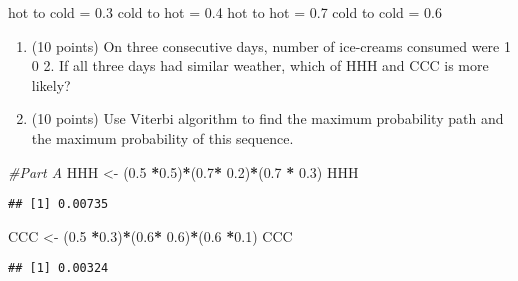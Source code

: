 \documentclass[
]{article}
\newenvironment{Shaded}{\begin{snugshade}}{\end{snugshade}}
\newcommand{\CommentTok}[1]{\textcolor[rgb]{0.56,0.35,0.01}{\textit{#1}}}
\newcommand{\FloatTok}[1]{\textcolor[rgb]{0.00,0.00,0.81}{#1}}
\newcommand{\NormalTok}[1]{#1}
\newcommand{\OperatorTok}[1]{\textcolor[rgb]{0.81,0.36,0.00}{\textbf{#1}}}
\newcommand{\StringTok}[1]{\textcolor[rgb]{0.31,0.60,0.02}{#1}}
\providecommand{\tightlist}{%
  \setlength{\itemsep}{0pt}\setlength{\parskip}{0pt}}
\begin{document}
hot to cold = 0.3 cold to hot = 0.4 hot to hot = 0.7 cold to cold = 0.6

\begin{enumerate}
\def\labelenumi{(\alph{enumi})}
\tightlist
\item
  (10 points) On three consecutive days, number of ice-creams consumed
  were 1 0 2. If all three days had similar weather, which of HHH and
  CCC is more likely?
\item
  (10 points) Use Viterbi algorithm to find the maximum probability path
  and the maximum probability of this sequence.
\end{enumerate}

\begin{Shaded}
\begin{Highlighting}[]
\CommentTok{#Part A}
\NormalTok{HHH <-}\StringTok{ }\NormalTok{(}\FloatTok{0.5} \OperatorTok{*}\FloatTok{0.5}\NormalTok{)}\OperatorTok{*}\NormalTok{(}\FloatTok{0.7}\OperatorTok{*}\StringTok{ }\FloatTok{0.2}\NormalTok{)}\OperatorTok{*}\NormalTok{(}\FloatTok{0.7} \OperatorTok{*}\StringTok{ }\FloatTok{0.3}\NormalTok{)}
\NormalTok{HHH}
\end{Highlighting}
\end{Shaded}

\begin{verbatim}
## [1] 0.00735
\end{verbatim}

\begin{Shaded}
\begin{Highlighting}[]
\NormalTok{CCC <-}\StringTok{ }\NormalTok{(}\FloatTok{0.5} \OperatorTok{*}\FloatTok{0.3}\NormalTok{)}\OperatorTok{*}\NormalTok{(}\FloatTok{0.6}\OperatorTok{*}\StringTok{ }\FloatTok{0.6}\NormalTok{)}\OperatorTok{*}\NormalTok{(}\FloatTok{0.6} \OperatorTok{*}\FloatTok{0.1}\NormalTok{)}
\NormalTok{CCC}
\end{Highlighting}
\end{Shaded}

\begin{verbatim}
## [1] 0.00324
\end{verbatim}
\end{document}
